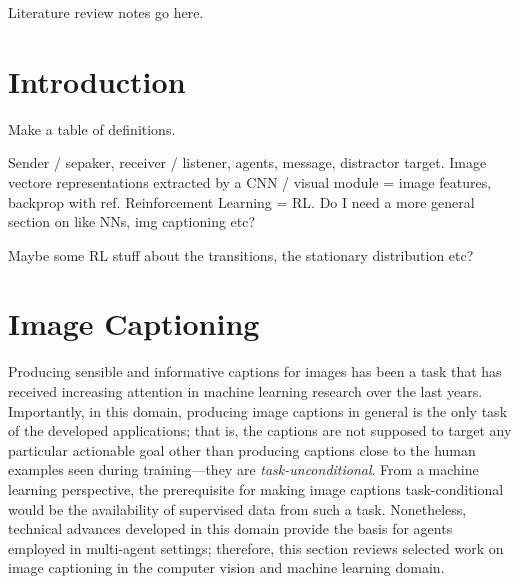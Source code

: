 Literature review notes go here. 

\section{Introduction}

Make a table of definitions.

Sender / sepaker, receiver / listener, agents, message, distractor target. Image vectore representations extracted by a CNN / visual module = image features, backprop with ref. Reinforcement Learning = RL.
Do I need a more general section on like NNs, img captioning etc?

Maybe some RL stuff about the transitions, the stationary distribution etc?


\section{Image Captioning}
Producing sensible and informative captions for images has been a task that has received increasing attention in machine learning research over the last years. Importantly, in this domain, producing image captions in general is the only task of the developed applications; that is, the captions are not supposed to target any particular actionable goal other than producing captions close to the human examples seen during training---they are \textit{task-unconditional}.  From a machine learning perspective, the prerequisite for making image captions task-conditional would be the availability of supervised data from such a task.  Nonetheless, technical advances developed in this domain provide the basis for agents employed in multi-agent settings; therefore, this section reviews selected work on image captioning in the computer vision and machine learning domain. 

